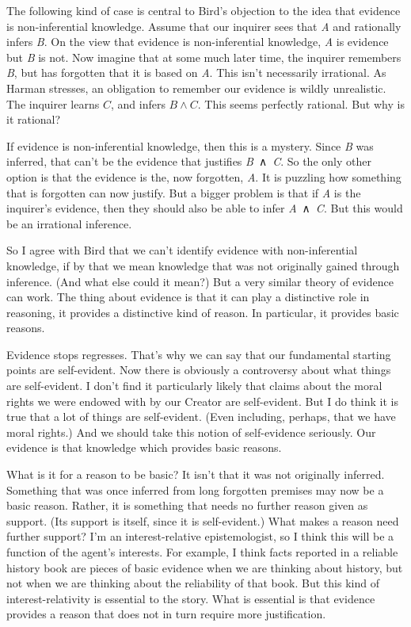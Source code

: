 \documentclass[
  11pt,
]{book}
\begin{document}
The following kind of case is central to Bird's objection to the idea that evidence is non-inferential knowledge. Assume that our inquirer sees that \emph{A} and rationally infers \emph{B}. On the view that evidence is non-inferential knowledge, \emph{A} is evidence but \emph{B} is not. Now imagine that at some much later time, the inquirer remembers \emph{B}, but has forgotten that it is based on \emph{A}. This isn't necessarily irrational. As Harman \citeyearpar{Harman1986} stresses, an obligation to remember our evidence is wildly unrealistic. The inquirer learns \(C\), and infers \(B \wedge C\). This seems perfectly rational. But why is it rational?

If evidence is non-inferential knowledge, then this is a mystery. Since \emph{B} was inferred, that can't be the evidence that justifies \emph{B}~∧~\emph{C}. So the only other option is that the evidence is the, now forgotten, \emph{A}. It is puzzling how something that is forgotten can now justify. But a bigger problem is that if \emph{A} is the inquirer's evidence, then they should also be able to infer \emph{A}~∧~\emph{C}. But this would be an irrational inference.

So I agree with Bird that we can't identify evidence with non-inferential knowledge, if by that we mean knowledge that was not originally gained through inference. (And what else could it mean?) But a very similar theory of evidence can work. The thing about evidence is that it can play a distinctive role in reasoning, it provides a distinctive kind of reason. In particular, it provides basic reasons.

Evidence stops regresses. That's why we can say that our fundamental starting points are self-evident. Now there is obviously a controversy about what things are self-evident. I don't find it particularly likely that claims about the moral rights we were endowed with by our Creator are self-evident. But I do think it is true that a lot of things are self-evident. (Even including, perhaps, that we have moral rights.) And we should take this notion of self-evidence seriously. Our evidence is that knowledge which provides basic reasons.

What is it for a reason to be basic? It isn't that it was not originally inferred. Something that was once inferred from long forgotten premises may now be a basic reason. Rather, it is something that needs no further reason given as support. (Its support is itself, since it is self-evident.) What makes a reason need further support? I'm an interest-relative epistemologist, so I think this will be a function of the agent's interests. For example, I think facts reported in a reliable history book are pieces of basic evidence when we are thinking about history, but not when we are thinking about the reliability of that book. But this kind of interest-relativity is essential to the story. What is essential is that evidence provides a reason that does not in turn require more justification.
\end{document}
